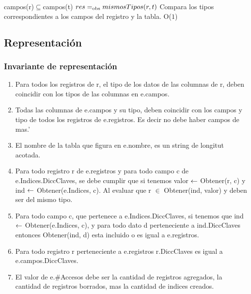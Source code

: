  {campos(r)$\subseteq$campos(t)}%
 {$res =_{\mathrm{obs}} mismosTipos(r,t)$}
 {Compara los tipos correspondientes a los campos del registro y la tabla.}
 {O($1$)}%
 {} 
 
\newpage
\subsection{Representación}

{
{ 
}
}

  
\subsubsection*{Invariante de representación}

\begin{enumerate}
  \item Para todos los registros de r, el tipo de los datos de las columnas de r, deben coincidir con los tipos de las columnas en e.campos.
  \item Todas las columnas de e.campos y su tipo, deben coincidir con los campos y tipo de todos los registros de e.registros. Es decir no debe haber campos de mas.'
  \item El nombre de la tabla que figura en e.nombre, es un string de longitut acotada.
  \item Para todo registro r de e.registros y para todo campo c de e.Indices.DiccClaves, se debe cumplir que si tenemos valor $\leftarrow$ Obtener(r, c) y ind $\leftarrow$ Obtener(e.Indices, c). Al evaluar que r $\in$ Obtener(ind, valor) y deben ser del mismo tipo.
  \item Para todo campo c, que pertenece a e.Indices.DiccClaves, si tenemos que  ind $\leftarrow$ Obtener(e.Indices, c), y para todo dato d perteneciente a ind.DiccClaves entonces Obtener(ind, d) esta incluido o es igual a e.registros.
  \item Para todo registro r perteneciente  a e.registros r.DiccClaves es igual a e.campos.DiccClaves.
  \item El valor de e.\#Accesos debe ser la cantidad de registros agregados, la cantidad de registros borrados, mas la cantidad de indices creados.
\end{enumerate}

